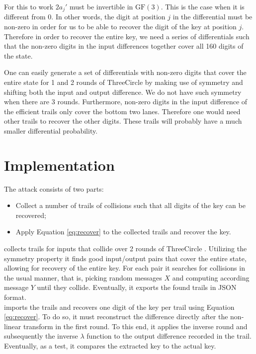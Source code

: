\documentclass{report}
\newcommand{\GF}{\text{GF}}
\newcommand{\ThreeCircle}{{\sc ThreeCircle} }
\begin{document}
For this to work $2a_j'$ must be invertible in $\GF(3)$. This is the case when it is different from 0. In other words, the digit at position $j$ in the differential must be non-zero in order for us to be able to recover the digit of the key at position $j$. Therefore in order to recover the entire key, we need a series of differentials such that the non-zero digits in the input differences together cover all 160 digits of the state.

One can easily generate a set of differentials with non-zero digits that cover the entire state for 1 and 2 rounds of \ThreeCircle by making use of symmetry and shifting both the input and output difference. We do not have such symmetry when there are 3 rounds. Furthermore, non-zero digits in the input difference of the efficient trails only cover the bottom two lanes. Therefore one would need other trails to recover the other digits. These trails will probably have a much smaller differential probability.

\section{Implementation}
The attack consists of two parts:
\begin{itemize} 
\item Collect a number of trails of collisions such that all digits of the key can be recovered;
\item Apply Equation \ref{eq:recover} to the collected trails and recover the key.
\end{itemize}

\noindent{} collects trails for inputs that collide over 2 rounds of \ThreeCircle. Utilizing the symmetry property it finds good input/output pairs that cover the entire state, allowing for recovery of the entire key. For each pair it searches for collisions in the usual manner, that is, picking random messages $X$ and computing according message $Y$ until they collide. Eventually, it exports the found trails in JSON format.\\

\noindent{} imports the trails and recovers one digit of the key per trail using Equation \ref{eq:recover}. To do so, it must reconstruct the difference directly after the non-linear transform in the first round. To this end, it applies the inverse round and subsequently the inverse $\lambda$ function to the output difference recorded in the trail. Eventually, as a test, it compares the extracted key to the actual key.


\end{document}
